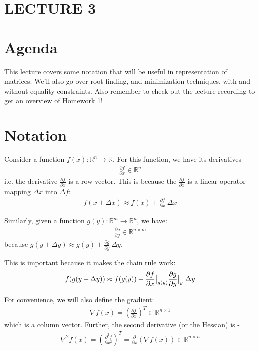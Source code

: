 \newpage
\section*{LECTURE 3}
\section{Agenda}

This lecture covers some notation that will be useful in representation of matrices. We'll also go over root finding, and minimization techniques, with and without equality constraints. Also remember to check out the lecture recording to get an overview of Homework 1! 

\section{Notation}
Consider a function $f(x): \mathbb{R}^n \longrightarrow  \mathbb{R}$. For this function, we have its derivatives
\begin{align}
    \frac{\partial f}{\partial x} \in \mathbb{R}^n
\end{align}
i.e. the derivative $\frac{\partial f}{\partial x}$ is a row vector. This is because the $\frac{\partial f}{\partial x}$ is a linear operator mapping $\Delta x$ into $\Delta f$:
\begin{align}
    f(x + \Delta x) \approx f(x) + \frac{\partial f}{\partial x} \ \Delta x
\end{align}

\noindent
Similarly, given a function $g(y): \mathbb{R}^m \longrightarrow \mathbb{R}^n$, we have: 
\begin{align}
    \frac{\partial g}{\partial y} \in \mathbb{R}^{n \times m}
\end{align}
because $g(y+\Delta y) \approx g(y) + \frac{\partial g}{\partial y} \ \Delta y$.

\noindent
This is important because it makes the chain rule work:
\begin{align}
    f(g(y+\Delta y)) \approx f(g(y)) + \evalat{\frac{\partial f}{\partial x}}{g(y)} \evalat{\frac{\partial g}{\partial y}}{y} \ \Delta y
\end{align}

\noindent
For convenience, we will also define the gradient: 
\begin{align}
    \nabla f(x) = ( \frac{\partial f}{\partial x})^T \in \mathbb{R}^{n \times 1}
\end{align}
which is a column vector. Further, the second derivative (or the Hessian) is - 
\begin{align}
    \nabla^2 f(x) = ( \frac{\partial^2 f}{\partial x^2})^T = \frac{\partial}{\partial x} (\nabla f(x)) \in \mathbb{R}^{n \times n}
\end{align}

